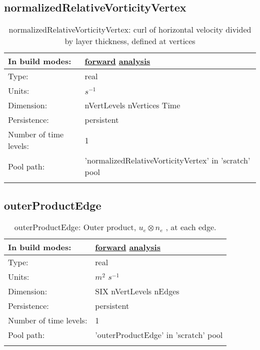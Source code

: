 \subsection[normalizedRelativeVorticityVertex]{normalizedRelativeVorticityVertex}
\label{subsec:var_sec_scratch_normalizedRelativeVorticityVertex}
\begin{center}
\begin{longtable}{| p{2.0in} | p{4.0in} |}
        \hline 
        In build modes: & \hyperref[subsec:forward_var_tab_scratch]{forward} \hyperref[subsec:analysis_var_tab_scratch]{analysis} \\
        \hline 
        Type: & real \\
        \hline 
        Units: & $s^{-1}$ \\
        \hline 
        Dimension: & nVertLevels nVertices Time \\
        \hline 
        Persistence: & persistent \\
        \hline 
        Number of time levels: & 1 \\
        \hline 
            Pool path: & 'normalizedRelativeVorticityVertex' in 'scratch' pool
 \\
		 \hline 
    \caption{normalizedRelativeVorticityVertex: curl of horizontal velocity divided by layer thickness, defined at vertices}
\end{longtable}
\end{center}
\subsection[outerProductEdge]{outerProductEdge}
\label{subsec:var_sec_scratch_outerProductEdge}
\begin{center}
\begin{longtable}{| p{2.0in} | p{4.0in} |}
        \hline 
        In build modes: & \hyperref[subsec:forward_var_tab_scratch]{forward} \hyperref[subsec:analysis_var_tab_scratch]{analysis} \\
        \hline 
        Type: & real \\
        \hline 
        Units: & $m^2$ $s^{-1}$ \\
        \hline 
        Dimension: & SIX nVertLevels nEdges \\
        \hline 
        Persistence: & persistent \\
        \hline 
        Number of time levels: & 1 \\
        \hline 
            Pool path: & 'outerProductEdge' in 'scratch' pool
 \\
		 \hline 
    \caption{outerProductEdge:  Outer product,  $u_e \otimes n_e$ , at each edge.}
\end{longtable}
\end{center}
